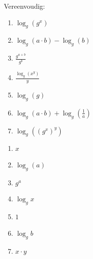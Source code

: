 \begin{oef}
Vereenvoudig:
\begin{enumerate}
  \item $\log_g(g^x)$
  \item $\log_g(a \cdot b) - \log_g(b)$
  \item $\displaystyle \frac{g^{a+b}}{g^b}$
  \item $\displaystyle \frac{\log_g(x^y)}{y}$
  \item $\log_g(g)$
  \item $\displaystyle \log_g(a \cdot b) + \log_g(\frac1a)$
  \item $\log_g((g^x)^y)$
\end{enumerate}
\begin{opl}
\begin{enumerate}
  \item $x$
  \item $\log_g(a)$
  \item $g^a$
  \item $\log_g x$
  \item $1$
  \item $\log_g b$
  \item $x \cdot y$
\end{enumerate}
\end{opl}
\end{oef}

